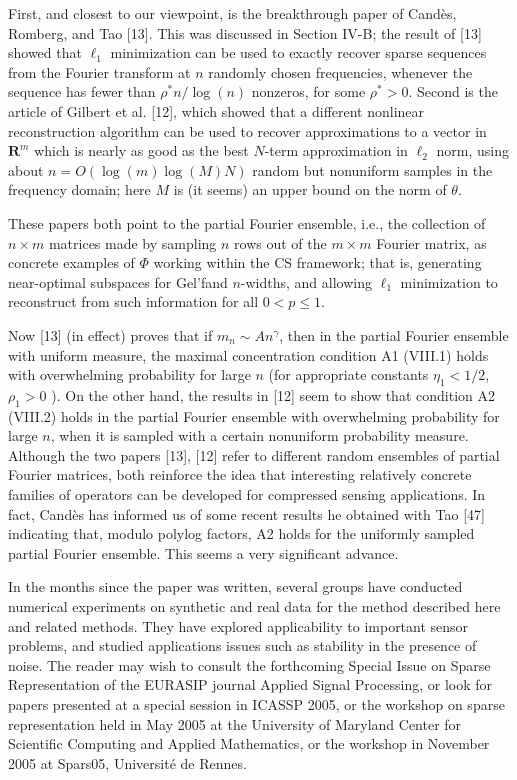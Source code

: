\documentclass[10pt]{article}
\begin{document}
First, and closest to our viewpoint, is the breakthrough paper of Candès, Romberg, and Tao [13]. This was discussed in Section IV-B; the result of [13] showed that $\ell_{1}$ minimization can be used to exactly recover sparse sequences from the Fourier transform at $n$ randomly chosen frequencies, whenever the sequence has fewer than $\rho^{*} n / \log (n)$ nonzeros, for some $\rho^{*}>0$. Second is the article of Gilbert et al. [12], which showed that a different nonlinear reconstruction algorithm can be used to recover approximations to a vector in $\boldsymbol{R}^{m}$ which is nearly as good as the best $N$-term approximation in $\ell_{2}$ norm, using about $n=O(\log (m) \log (M) N)$ random but nonuniform samples in the frequency domain; here $M$ is (it seems) an upper bound on the norm of $\theta$.

These papers both point to the partial Fourier ensemble, i.e., the collection of $n \times m$ matrices made by sampling $n$ rows out of the $m \times m$ Fourier matrix, as concrete examples of $\Phi$ working within the CS framework; that is, generating near-optimal subspaces for Gel'fand $n$-widths, and allowing $\ell_{1}$ minimization to reconstruct from such information for all $0<p \leq 1$.

Now [13] (in effect) proves that if $m_{n} \sim A n^{\gamma}$, then in the partial Fourier ensemble with uniform measure, the maximal concentration condition A1 (VIII.1) holds with overwhelming probability for large $n$ (for appropriate constants $\eta_{1}<1 / 2$, $\rho_{1}>0$ ). On the other hand, the results in [12] seem to show that condition A2 (VIII.2) holds in the partial Fourier ensemble with overwhelming probability for large $n$, when it is sampled with a certain nonuniform probability measure. Although the two papers [13], [12] refer to different random ensembles of partial Fourier matrices, both reinforce the idea that interesting relatively concrete families of operators can be developed for compressed sensing applications. In fact, Candès has informed us of some recent results he obtained with Tao [47] indicating that, modulo polylog factors, A2 holds for the uniformly sampled partial Fourier ensemble. This seems a very significant advance.

In the months since the paper was written, several groups have conducted numerical experiments on synthetic and real data for the method described here and related methods. They have explored applicability to important sensor problems, and studied applications issues such as stability in the presence of noise. The reader may wish to consult the forthcoming Special Issue on Sparse Representation of the EURASIP journal Applied Signal Processing, or look for papers presented at a special session in ICASSP 2005, or the workshop on sparse representation held in May 2005 at the University of Maryland Center for Scientific Computing and Applied Mathematics, or the workshop in November 2005 at Spars05, Université de Rennes.
\end{document}
